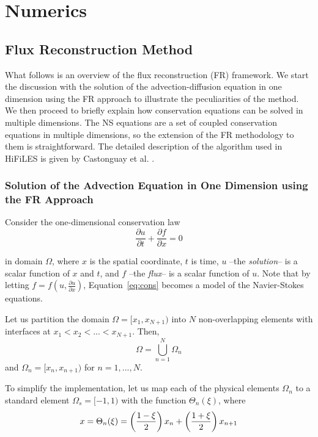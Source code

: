 
\section{Numerics}
\label{sec:numerics}
\subsection{Flux Reconstruction Method}

What follows is an overview of the flux reconstruction (FR) framework. We start the discussion with the solution of the advection-diffusion equation in one dimension using the FR approach to illustrate the peculiarities of the method. We then proceed to briefly explain how conservation equations can be solved in multiple dimensions. The NS equations are a set of coupled conservation equations in multiple dimensions, so the extension of the FR methodology to them is straightforward. The detailed description of the algorithm used in HiFiLES is given by Castonguay et al. \cite{castonguay2011}.

\subsubsection{Solution of the Advection Equation in One Dimension using the FR Approach}

Consider the one-dimensional conservation law
\begin{equation}
\label{eq:cons}
\frac{\partial u}{\partial t} + \frac{\partial f}{\partial x} = 0
\end{equation}

in domain $\Omega$, where $x$ is the spatial coordinate, $t$ is time, $u$ --the \emph{solution}-- is a scalar function of $x$ and $t$, and $f$ --the \emph{flux}-- is a scalar function of $u$. Note that by letting $f = f(u,\frac{\partial u}{\partial x})$, Equation~\ref{eq:cons} becomes a model of the Navier-Stokes equations.

Let us partition the domain $\Omega = [x_1,x_{N+1})$ into $N$ non-overlapping elements with 
interfaces at $x_1<x_2<...<x_{N+1}$. Then,
\begin{equation}
\Omega = \bigcup^N_{n=1} \Omega_n
\end{equation}
and $\Omega_n = [x_n,x_{n+1})$ for $n = 1,...,N$.

To simplify the implementation, let us map each of the physical elements $\Omega_n$ to a standard 
element $\Omega_s=[-1,1)$ with the function $\Theta_n(\xi)$, where
\begin{equation}
x = \Theta_n(\xi) = \left( \frac{1-\xi}{2} \right) x_n + \left(\frac{1+\xi}{2}\right) x_{n+1} 
\end{equation}

